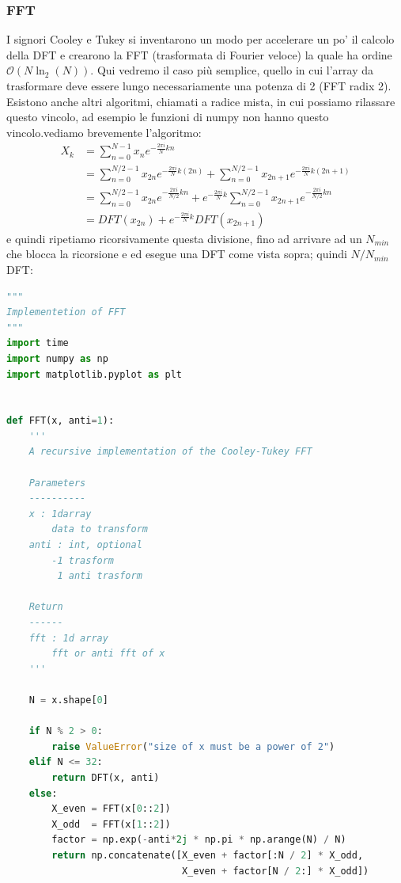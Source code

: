 \documentclass[10pt,a4paper]{article}
\begin{document}
\subsubsection{FFT}
I signori Cooley e Tukey si inventarono un modo per accelerare un po' il calcolo della DFT e crearono la FFT (trasformata di Fourier veloce) la quale ha ordine $\mathcal{O}(N \ln_2 (N))$. Qui vedremo il caso più semplice, quello in cui l'array da trasformare deve essere lungo necessariamente una potenza di 2 (FFT radix 2). Esistono anche altri algoritmi, chiamati a radice mista, in cui possiamo rilassare questo vincolo, ad esempio le funzioni di numpy non hanno questo vincolo.vediamo brevemente l'algoritmo:
\begin{align}
X_k &= \sum_{n=0}^{N-1} x_n e^{-\frac{2 \pi i}{N} kn} \\
&= \sum_{n=0}^{N/2-1} x_{2n} e^{-\frac{2 \pi i}{N} k(2n)} + \sum_{n=0}^{N/2-1} x_{2n+1} e^{-\frac{2 \pi i}{N} k(2n+1)} \\
&= \sum_{n=0}^{N/2-1} x_{2n} e^{-\frac{2 \pi i}{N/2} kn} + e^{-\frac{2 \pi i}{N} k} \sum_{n=0}^{N/2-1} x_{2n+1} e^{-\frac{2 \pi i}{N/2} kn} \\
&= DFT(x_{2n}) + e^{-\frac{2 \pi i}{N} k} DFT(x_{2n+1})
\end{align}
e quindi ripetiamo ricorsivamente questa divisione, fino ad arrivare ad un $N_{min}$ che blocca la ricorsione e ed esegue una DFT come vista sopra; quindi $N/N_{min}$ DFT:
\begin{lstlisting}[language=Python]
"""
Implementetion of FFT
"""
import time
import numpy as np
import matplotlib.pyplot as plt


def FFT(x, anti=1):
    '''
    A recursive implementation of the Cooley-Tukey FFT
    
    Parameters
    ----------
    x : 1darray
        data to transform
    anti : int, optional
        -1 trasform
         1 anti trasform

    Return
    ------
    fft : 1d array
        fft or anti fft of x
    '''
    
    N = x.shape[0]
    
    if N % 2 > 0:
        raise ValueError("size of x must be a power of 2")
    elif N <= 32:
        return DFT(x, anti)
    else:
        X_even = FFT(x[0::2])
        X_odd  = FFT(x[1::2])
        factor = np.exp(-anti*2j * np.pi * np.arange(N) / N)
        return np.concatenate([X_even + factor[:N / 2] * X_odd,
                               X_even + factor[N / 2:] * X_odd])
                               
\end{lstlisting}
\end{document}
